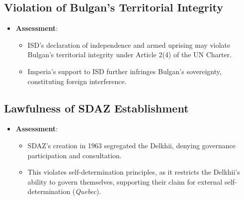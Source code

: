\subsection{Violation of Bulgan’s Territorial Integrity}
\begin{itemize}
    \item \textbf{Assessment}:
    \begin{itemize}
        \item ISD’s declaration of independence and armed uprising may violate Bulgan’s territorial integrity under Article 2(4) of the UN Charter.
        \item Imperia’s support to ISD further infringes Bulgan’s sovereignty, constituting foreign interference.
    \end{itemize}
\end{itemize}

\subsection{Lawfulness of SDAZ Establishment}
\begin{itemize}
    \item \textbf{Assessment}:
    \begin{itemize}
        \item SDAZ’s creation in 1963 segregated the Delkhii, denying governance participation and consultation.
        \item This violates self-determination principles, as it restricts the Delkhii’s ability to govern themselves, supporting their claim for external self-determination (\textit{Quebec}).
    \end{itemize}
\end{itemize}

